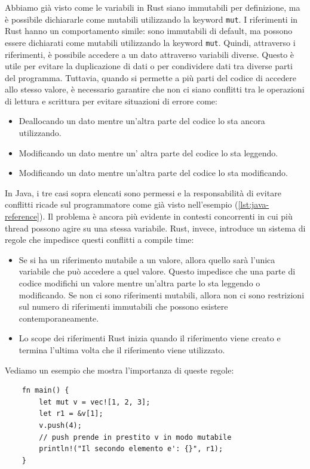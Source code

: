 Abbiamo già visto come le variabili in Rust siano immutabili per definizione, ma è possibile dichiararle come mutabili utilizzando la keyword \texttt{mut}. I riferimenti in Rust hanno un comportamento simile: sono immutabili di default, ma possono essere dichiarati come mutabili utilizzando la keyword \texttt{mut}. Quindi, attraverso i riferimenti, è possibile accedere a un dato attraverso variabili diverse. Questo è utile per evitare la duplicazione di dati o per condividere dati tra diverse parti del programma. Tuttavia, quando si permette a più parti del codice di accedere allo stesso valore, è necessario garantire che non ci siano conflitti tra le operazioni di lettura e scrittura per evitare situazioni di errore come:
\begin{itemize}
    \item Deallocando un dato mentre un'altra parte del codice lo sta ancora utilizzando.
    \item Modificando un dato mentre un' altra parte del codice lo sta leggendo.
    \item Modificando un dato mentre un'altra parte del codice lo sta modificando.
\end{itemize} 
In Java, i tre casi sopra elencati sono permessi e la responsabilità di evitare conflitti ricade sul programmatore come già visto nell'esempio (\ref{lst:java-reference}). Il problema è ancora più evidente in contesti concorrenti in cui più thread possono agire su una stessa variabile. Rust, invece, introduce un sistema di regole che impedisce questi conflitti a compile time:
\begin{itemize}
    \item Se si ha un riferimento mutabile a un valore, allora quello sarà l'unica variabile che può accedere a quel valore. Questo impedisce che una parte di codice modifichi un valore mentre un'altra parte lo sta leggendo o modificando. Se non ci sono riferimenti mutabili, allora non ci sono restrizioni sul numero di riferimenti immutabili che possono esistere contemporaneamente. 
    \item Lo scope dei riferimenti Rust inizia quando il riferimento viene creato e termina l'ultima volta che il riferimento viene utilizzato. 
\end{itemize}
Vediamo un esempio che mostra l'importanza di queste regole:
\begin{verbatim}
    fn main() {
        let mut v = vec![1, 2, 3];
        let r1 = &v[1];
        v.push(4);
        // push prende in prestito v in modo mutabile
        println!("Il secondo elemento e': {}", r1);
    } 
\end{verbatim}
